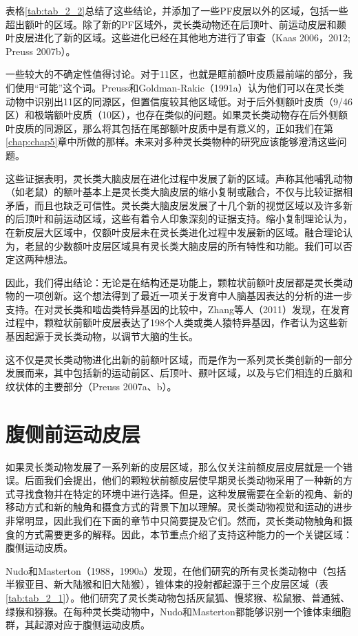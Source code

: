 表格\ref{tab:tab_2_2}总结了这些结论，并添加了一些PF皮层以外的区域，包括一些超出额叶的区域。除了新的PF区域外，灵长类动物还在后顶叶、前运动皮层和颞叶皮层进化了新的区域。这些进化已经在其他地方进行了审查（Kaas 2006，2012; Preuss 2007b）。


一些较大的不确定性值得讨论。对于11区，也就是眶前额叶皮质最前端的部分，我们使用“可能”这个词。Preuss和Goldman-Rakic（1991a）认为他们可以在灵长类动物中识别出11区的同源区，但置信度较其他区域低。对于后外侧额叶皮质（9/46区）和极端额叶皮质（10区），也存在类似的问题。如果灵长类动物存在后外侧额叶皮质的同源区，那么将其包括在尾部额叶皮质中是有意义的，正如我们在第\ref{chap:chap5}章中所做的那样。未来对多种灵长类物种的研究应该能够澄清这些问题。

这些证据表明，灵长类大脑皮层在进化过程中发展了新的区域。声称其他哺乳动物（如老鼠）的额叶基本上是灵长类大脑皮层的缩小复制或融合，不仅与比较证据相矛盾，而且也缺乏可信性。灵长类大脑皮层发展了十几个新的视觉区域以及许多新的后顶叶和前运动区域，这些有着令人印象深刻的证据支持。缩小复制理论认为，在新皮层大区域中，仅额叶皮层未在灵长类进化过程中发展新的区域。融合理论认为，老鼠的少数额叶皮层区域具有灵长类大脑皮层的所有特性和功能。我们可以否定这两种想法。

因此，我们得出结论：无论是在结构还是功能上，颗粒状前额叶皮层都是灵长类动物的一项创新。这个想法得到了最近一项关于发育中人脑基因表达的分析的进一步支持。在对灵长类和啮齿类特异基因的比较中，Zhang等人（2011）发现，在发育过程中，颗粒状前额叶皮层表达了198个人类或类人猿特异基因，作者认为这些新基因起源于灵长类动物，以调节大脑的生长。

这不仅是灵长类动物进化出新的前额叶区域，而是作为一系列灵长类创新的一部分发展而来，其中包括新的运动前区、后顶叶、颞叶区域，以及与它们相连的丘脑和纹状体的主要部分（Preuss 2007a、b）。

\section{腹侧前运动皮层}
如果灵长类动物发展了一系列新的皮层区域，那么仅关注前额皮层皮层就是一个错误。后面我们会提出，他们的颗粒状前额皮层使早期灵长类动物采用了一种新的方式寻找食物并在特定的环境中进行选择。但是，这种发展需要在全新的视角、新的移动方式和新的触角和摄食方式的背景下加以理解。灵长类动物视觉和运动的进步非常明显，因此我们在下面的章节中只简要提及它们。然而，灵长类动物触角和摄食的方式需要更多的解释。因此，本节重点介绍了支持这种能力的一个关键区域：腹侧运动皮质。

Nudo和Masterton（1988，1990a）发现，在他们研究的所有灵长类动物中（包括半猴亚目、新大陆猴和旧大陆猴），锥体束的投射都起源于三个皮层区域（表\ref{tab:tab_2_1}）。他们研究了灵长类动物包括灰鼠狐、慢浆猴、松鼠猴、普通狨、绿猴和猕猴。在每种灵长类动物中，Nudo和Masterton都能够识别一个锥体束细胞群，其起源对应于腹侧运动皮质。

